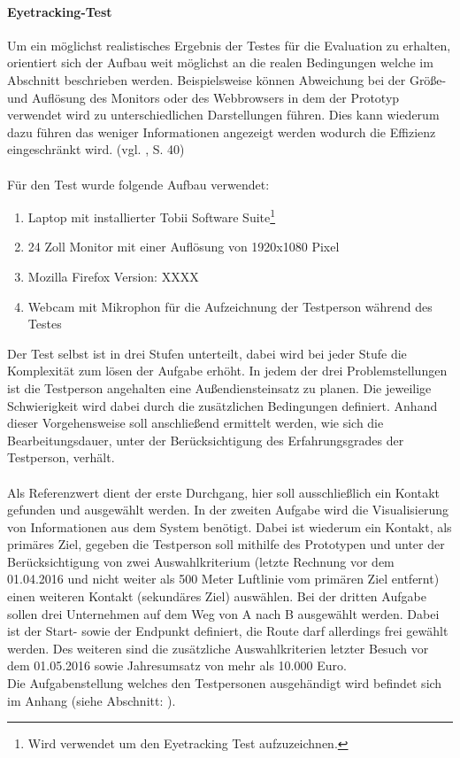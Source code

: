 \documentclass[Bachelorarbeit.tex]{subfiles}
\begin{document}
\paragraph{Eyetracking-Test}
Um ein möglichst realistisches Ergebnis der Testes für die Evaluation zu erhalten, orientiert sich der Aufbau weit möglichst an die realen Bedingungen welche im Abschnitt  beschrieben werden.
Beispielsweise können Abweichung bei der Größe- und Auflösung des Monitors oder des Webbrowsers in dem der Prototyp verwendet wird zu unterschiedlichen Darstellungen führen. 
Dies kann wiederum dazu führen das weniger Informationen angezeigt werden wodurch die Effizienz eingeschränkt wird. (vgl. \cite{Ollermann2007}, S. 40)\\
\\
Für den Test wurde folgende Aufbau verwendet:
\begin{enumerate}
	\item Laptop mit installierter Tobii Software Suite\footnote{Wird verwendet um den Eyetracking Test aufzuzeichnen.}
	\item 24 Zoll Monitor mit einer Auflösung von 1920x1080 Pixel
	\item Mozilla Firefox Version: XXXX
	\item Webcam mit Mikrophon für die Aufzeichnung der Testperson während des Testes
\end{enumerate}

Der Test selbst ist in drei Stufen unterteilt, dabei wird bei jeder Stufe die Komplexität zum lösen der Aufgabe erhöht. 
In jedem der drei Problemstellungen ist die Testperson angehalten eine Außendiensteinsatz zu planen. 
Die jeweilige Schwierigkeit wird dabei durch die zusätzlichen Bedingungen definiert.
Anhand dieser Vorgehensweise soll anschließend ermittelt werden, wie sich die Bearbeitungsdauer, unter der Berücksichtigung des Erfahrungsgrades der Testperson, verhält. \\
\\
Als Referenzwert dient der erste Durchgang, hier soll ausschließlich ein Kontakt gefunden und ausgewählt werden. 
In der zweiten Aufgabe wird die Visualisierung von Informationen aus dem System benötigt. 
Dabei ist wiederum ein Kontakt, als primäres Ziel, gegeben die Testperson soll mithilfe des Prototypen und unter der Berücksichtigung von zwei Auswahlkriterium (letzte Rechnung vor dem 01.04.2016 und nicht weiter als 500 Meter Luftlinie vom primären Ziel entfernt) einen weiteren Kontakt (sekundäres Ziel) auswählen. 
Bei der dritten Aufgabe sollen drei Unternehmen auf dem Weg von A nach B ausgewählt werden.
Dabei ist der Start- sowie der Endpunkt definiert, die Route darf allerdings frei gewählt werden. 
Des weiteren sind die zusätzliche Auswahlkriterien letzter Besuch vor dem 01.05.2016 sowie Jahresumsatz von mehr als 10.000 Euro.
\\
Die Aufgabenstellung welches den Testpersonen ausgehändigt wird befindet sich im Anhang (siehe Abschnitt: ).
\end{document}
